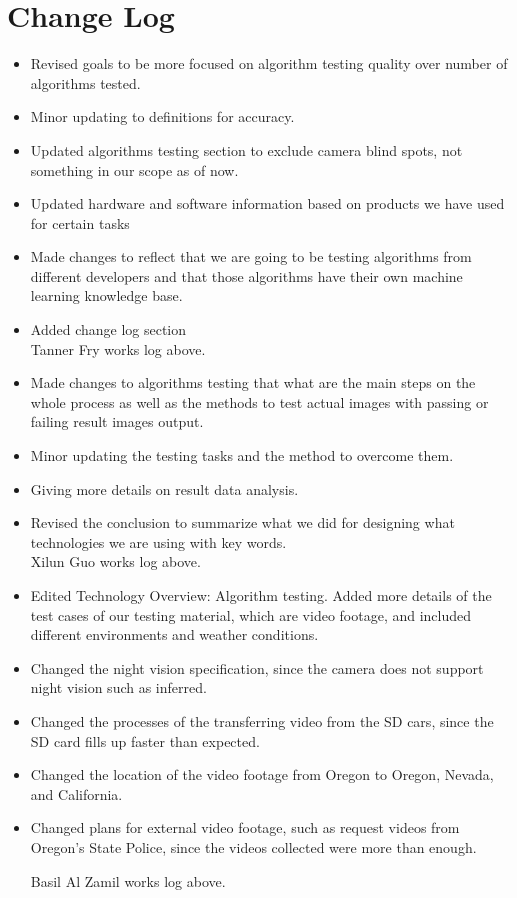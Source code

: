 \section{Change Log}
\begin{itemize}
    \item Revised goals to be more focused on algorithm testing quality over number of algorithms tested.
    \item Minor updating to definitions for accuracy.
    \item Updated algorithms testing section to exclude camera blind spots, not something in our scope as of now.
    \item Updated hardware and software information based on products we have used for certain tasks
    \item Made changes to reflect that we are going to be testing algorithms from different developers and that those algorithms have their own machine learning knowledge base.
    \item Added change log section\\

Tanner Fry works log above.\\
    
    \item Made changes to algorithms testing that what are the main steps on the whole process as well as the methods to test actual images with passing or failing result images output.
    \item Minor updating the testing tasks and the method to overcome them.
    \item Giving more details on result data analysis.
    \item Revised the conclusion to summarize what we did for designing what technologies we are using with key words.\\
     
Xilun Guo works log above.\\

    \item Edited Technology Overview: Algorithm testing. Added more details of the test cases of our testing material, which are video footage, and included different environments and weather conditions. 
    \item Changed the night vision specification, since the camera does not support night vision such as inferred.
    \item Changed the processes of the transferring video from the SD cars, since the SD card fills up faster than expected.
    \item Changed the location of the video footage from Oregon to Oregon, Nevada, and California.
    \item Changed plans for external video footage, such as request videos from Oregon’s State Police, since the videos collected were more than enough.

Basil Al Zamil works log above.\\

\end{itemize}

